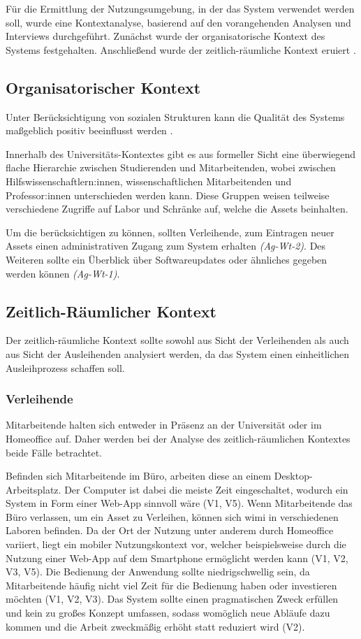 Für die Ermittlung der Nutzungsumgebung, in der das System verwendet werden soll, wurde eine
Kontextanalyse, basierend auf den vorangehenden Analysen und Interviews durchgeführt. Zunächst wurde
der organisatorische Kontext des Systems festgehalten. Anschließend wurde der zeitlich-räumliche
Kontext eruiert \cite{HerczegSoftEg2018}.

\subsection{Organisatorischer Kontext}
Unter Berücksichtigung von sozialen Strukturen kann die Qualität des Systems maßgeblich positiv
beeinflusst werden \cite{HerczegSoftEg2018}.

Innerhalb des Universitäts-Kontextes gibt es aus formeller Sicht eine überwiegend flache Hierarchie
zwischen Studierenden und Mitarbeitenden, wobei zwischen Hilfswissenschaftlern:innen,
wissenschaftlichen Mitarbeitenden und Professor:innen unterschieden werden kann. Diese Gruppen
weisen teilweise verschiedene Zugriffe auf Labor und Schränke auf, welche die Assets beinhalten.

Um die  berücksichtigen zu können, sollten Verleihende, zum Eintragen neuer
Assets einen administrativen Zugang zum System erhalten \textit{(Ag-Wt-2)}. Des Weiteren sollte ein
Überblick über Softwareupdates oder ähnliches gegeben werden können \textit{(Ag-Wt-1)}.


\subsection{Zeitlich-Räumlicher Kontext}
\label{section:zeit}
Der zeitlich-räumliche Kontext sollte sowohl aus Sicht der Verleihenden als auch aus Sicht der
Ausleihenden analysiert werden, da das System einen einheitlichen Ausleihprozess schaffen soll.

\subsubsection{Verleihende}
Mitarbeitende halten sich entweder in Präsenz an der Universität oder im Homeoffice auf. Daher
werden bei der Analyse des zeitlich-räumlichen Kontextes beide Fälle betrachtet.

Befinden sich Mitarbeitende im Büro, arbeiten diese an einem Desktop-Arbeitsplatz. Der Computer ist
dabei die meiste Zeit eingeschaltet, wodurch ein System in Form einer Web-App sinnvoll wäre (V1, V5).
Wenn Mitarbeitende das Büro verlassen, um ein Asset zu Verleihen, können sich \ac{wimi} in
verschiedenen Laboren befinden. Da der Ort der Nutzung unter anderem durch Homeoffice variiert,
liegt ein mobiler Nutzungskontext vor, welcher beispielsweise durch die Nutzung einer Web-App auf
dem Smartphone ermöglicht werden kann (V1, V2, V3, V5). Die Bedienung der Anwendung sollte
niedrigschwellig sein, da Mitarbeitende häufig nicht viel Zeit für die Bedienung haben oder
investieren möchten (V1, V2, V3). Das System sollte einen pragmatischen Zweck erfüllen und kein zu
großes Konzept umfassen, sodass womöglich neue Abläufe dazu kommen und die Arbeit zweckmäßig
erhöht statt reduziert wird (V2).

